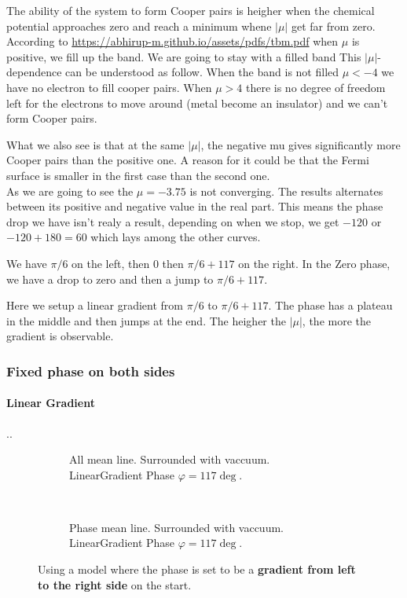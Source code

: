 \documentclass[../main.tex]{subfiles}
\begin{document}
The ability of the system to form Cooper pairs is heigher when the chemical potential approaches zero and reach a minimum 
whene $|\mu|$ get far from zero. According to \url{https://abhirup-m.github.io/assets/pdfs/tbm.pdf} when $\mu$ is positive,
we fill up the band. We are going to stay with a filled band This $|\mu|$-dependence can be understood
as follow. When the band is not filled $\mu<-4$ we have no electron to fill cooper pairs. When $\mu>4$ there is no degree of freedom
left for the electrons to move around (metal become an insulator) and we can't form Cooper pairs.

What we also see is that at the same $|\mu|$, the negative mu gives significantly more Cooper pairs than the positive one.
A reason for it could be that the Fermi surface is smaller in the first case than the second one.\\

As we are going to see the $\mu = -3.75$ is not converging. The results alternates between its positive and negative value in the real part.
This means the phase drop we have isn't realy a result, depending on when we stop, we get $-120$ or $-120+180 = 60$ which lays among the other curves. 




We have $\pi/6$ on the left, then $0$ then $\pi/6 + 117$ on the right. In the Zero phase, we have a drop to zero and then a jump to $\pi/6 + 117$.

Here we setup a linear gradient from $\pi/6$ to $\pi/6 + 117$. The phase has a plateau in the middle and then jumps at the end. The
heigher the $|\mu|$, the more the gradient is observable. 
\subsubsection{Fixed phase on both sides}
\paragraph{Linear Gradient}..
\begin{figure}[H]
    \begin{subfigure}{0.4\textwidth}
        \centering
        \hspace{-4cm} %
        
        \caption{All mean line. Surrounded with vaccuum. LinearGradient Phase $\varphi = 117\deg$.}
        \label{fig:first}
    \end{subfigure}    \\
    \begin{subfigure}{0.4\textwidth}
        \centering
        \hspace{-4cm} %
        
        \caption{Phase mean line. Surrounded with vaccuum. LinearGradient Phase $\varphi = 117\deg$.}
        \label{fig:first}
    \end{subfigure}   
    \caption{Using a model where the phase is set to be a \textbf{gradient from left to the right side} on the start.}
\end{figure}
\end{document}
